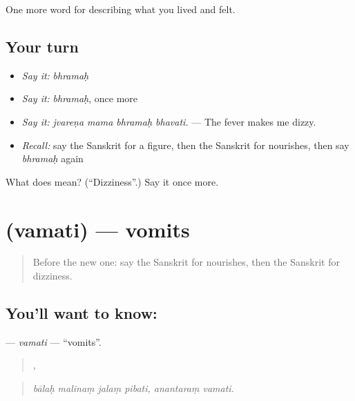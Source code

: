 \begin{grammarlens}[title={What you've built}]
One more word for describing what you lived and felt.
\end{grammarlens}

\subsection*{Your turn}
\begin{itemize}
\raggedright
  \item \emph{Say it:} \emph{bhramaḥ}
  \item \emph{Say it:} \emph{bhramaḥ}, once more
  \item \emph{Say it:} \emph{jvareṇa mama bhramaḥ bhavati.} — The fever makes me dizzy.
  \item \emph{Recall:} say the Sanskrit for a figure, then the Sanskrit for nourishes, then say \emph{bhramaḥ} again
\end{itemize}

\begin{tcolorbox}[breakable,colback=teal!4,colframe=teal!35!black,title={Before you move on}]
What does  mean? (\textquotedblleft{}Dizziness\textquotedblright{}.) Say it once more.
\end{tcolorbox}
\section[\texorpdfstring{\sk{वमति} (vamati)}{वमति (vamati)}]{ (vamati) — vomits}

\label{lesson:SA-C477-vamati}



\begin{quote}
Before the new one: say the Sanskrit for nourishes, then the Sanskrit for dizziness.
\end{quote}

\subsection*{You'll want to know: }
\textbf{} — \emph{vamati} — \textquotedblleft{}vomits\textquotedblright{}.

\begin{quote}
   ,  
\end{quote}

\begin{quote}
\emph{bālaḥ malinaṃ jalaṃ pibati, anantaraṃ vamati.}
\end{quote}

